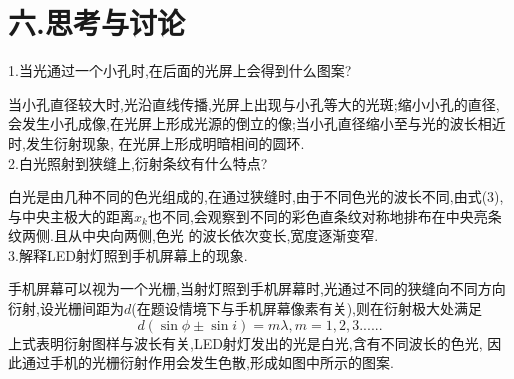 \documentclass[12pt,a4paper,oneside]{ctexart}
\begin{document}
 \section{六.思考与讨论}\noindent
 1.当光通过一个小孔时,在后面的光屏上会得到什么图案?
 \par 当小孔直径较大时,光沿直线传播,光屏上出现与小孔等大的光斑;缩小小孔的直径,
 会发生小孔成像,在光屏上形成光源的倒立的像;当小孔直径缩小至与光的波长相近时,发生衍射现象,
 在光屏上形成明暗相间的圆环.\\
 2.白光照射到狭缝上,衍射条纹有什么特点?\par
 白光是由几种不同的色光组成的,在通过狭缝时,由于不同色光的波长不同,由式(3),
 与中央主极大的距离$x_k$也不同,会观察到不同的彩色直条纹对称地排布在中央亮条纹两侧.且从中央向两侧,色光
 的波长依次变长,宽度逐渐变窄.\\
 3.解释LED射灯照到手机屏幕上的现象.\par
 手机屏幕可以视为一个光栅,当射灯照到手机屏幕时,光通过不同的狭缝向不同方向
 衍射,设光栅间距为$d$(在题设情境下与手机屏幕像素有关),则在衍射极大处满足
 $$d(\sin\phi\pm\sin i)=m\lambda,m=1,2,3......$$
上式表明衍射图样与波长有关,LED射灯发出的光是白光,含有不同波长的色光,
因此通过手机的光栅衍射作用会发生色散,形成如图中所示的图案.
\end{document}
